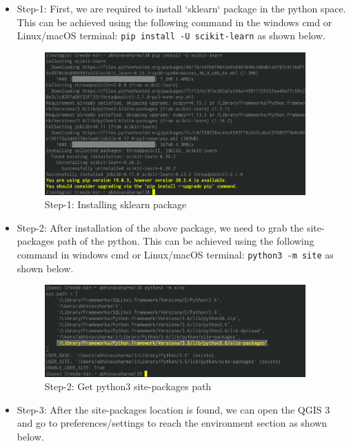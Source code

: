 \begin{itemize}
    \item Step-1: First, we are required to install `sklearn` package in the python space. This can be achieved using the following command in the windows cmd or Linux/macOS terminal: \texttt{pip install -U scikit-learn} as shown below.
    
    \begin{figure}[H]
\centering
\includegraphics[width=10cm,keepaspectratio=true]{resources/images/installq1.png}
\caption{Step-1: Installing sklearn package}
\label{fig:installq1}
\end{figure}
    
    \item Step-2: After installation of the above package, we need to grab the site-packages path of the python. This can be achieved using the following command in windows cmd or Linux/macOS terminal: \texttt{python3 -m site} as shown below.
    
        \begin{figure}[H]
\centering
\includegraphics[width=10cm,keepaspectratio=true]{resources/images/installq2.png}
\caption{Step-2: Get python3 site-packages path}
\label{fig:installq2}
\end{figure}

    \item Step-3: After the site-packages location is found, we can open the QGIS 3 and go to preferences/settings to reach the environment section as shown below.
    

\end{itemize}
